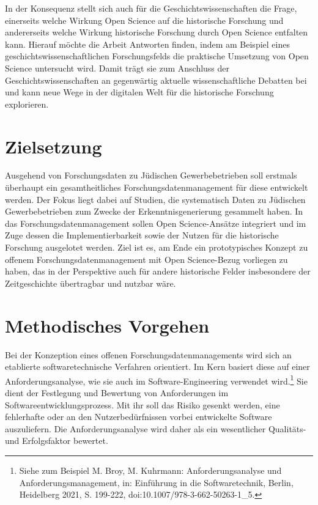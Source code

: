 In der Konsequenz stellt sich auch für die Geschichtswissenschaften die Frage, einerseits welche Wirkung Open Science auf die historische Forschung und andererseits welche Wirkung historische Forschung durch Open Science entfalten kann. Hierauf möchte die Arbeit Antworten finden, indem am Beispiel eines geschichtswissenschaftlichen Forschungsfelds die praktische Umsetzung von Open Science untersucht wird. Damit trägt sie zum Anschluss der Geschichtswissenschaften an gegenwärtig aktuelle wissenschaftliche Debatten bei und kann neue Wege in der digitalen Welt für die historische Forschung explorieren. 

\section{Zielsetzung}

Ausgehend von Forschungsdaten zu Jüdischen Gewerbebetrieben soll erstmals überhaupt ein gesamtheitliches Forschungsdatenmanagement für diese entwickelt werden. Der Fokus liegt dabei auf Studien, die systematisch Daten zu Jüdischen Gewerbebetrieben zum Zwecke der Erkenntnisgenerierung gesammelt haben. In das Forschungsdatenmanagement sollen Open Science-Ansätze integriert und im Zuge dessen die Implementierbarkeit sowie der Nutzen für die historische Forschung ausgelotet werden. Ziel ist es, am Ende ein prototypisches Konzept zu offenem Forschungsdatenmanagement mit Open Science-Bezug vorliegen zu haben, das in der Perspektive auch für andere historische Felder insbesondere der Zeitgeschichte übertragbar und nutzbar wäre.

\section{Methodisches Vorgehen}

Bei der Konzeption eines offenen Forschungsdatenmanagements wird sich an etablierte softwaretechnische Verfahren orientiert. Im Kern basiert diese auf einer Anforderungsanalyse, wie sie auch im Software-Engineering verwendet wird.\footnote{Siehe zum Beispiel M. Broy, M. Kuhrmann: Anforderungsanalyse und Anforderungsmanagement, in: Einführung in die Softwaretechnik, Berlin, Heidelberg 2021, S. 199-222, doi:10.1007/978-3-662-50263-1\_5.} Sie dient der Festlegung und Bewertung von Anforderungen im Softwareentwicklungsprozess. Mit ihr soll das Risiko gesenkt werden, eine fehlerhafte oder an den Nutzerbedürfnissen vorbei entwickelte Software auszuliefern. Die Anforderungsanalyse wird daher als ein wesentlicher Qualitäts- und Erfolgsfaktor bewertet.

